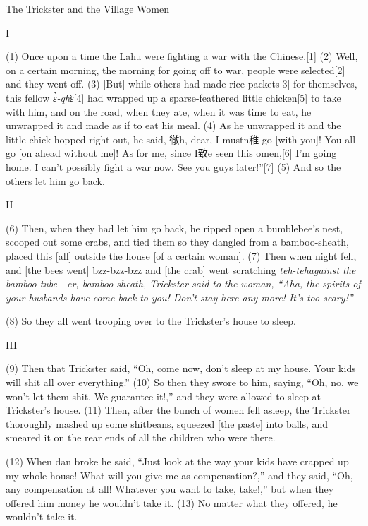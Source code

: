 
The Trickster and the Village Women

I

(1) Once upon a time the Lahu were fighting a war with the Chinese.[1] (2) Well,
on a certain morning, the morning for going off to war, people were selected[2]
and they went off. (3) [But] while others had made rice-packets[3] for themselves,
this fellow \textit{ɛ̀-qhɛ}̀[4] had wrapped up a sparse-feathered little chicken[5]
to take with him, and on the road, when they ate, when it was time to eat, he unwrapped
it and made as if to eat his meal. (4) As he unwrapped it and the little chick
hopped right out, he said, 徹h, dear, I mustn稚 go [with you]! You all go [on
ahead without me]! As for me, since I致e seen this omen,[6] I'm going home. I
can't possibly fight a war now. See you guys later!''[7] (5) And so the others
let him go back.

\begin{center}
II
\end{center}

\leftskip=0pt
(6) Then, when they had let him go back, he ripped open a bumblebee's nest, scooped
out some crabs, and tied them so they dangled from a bamboo-sheath, placed this
[all] outside the house [of a certain woman]. (7) Then when night fell, and [the
bees went] bzz-bzz-bzz and [the crab] went scratching \textit{teh-tehagainst the
bamboo-tube―er, bamboo-sheath, Trickster said to the woman, ``Aha, the spirits
of your husbands have come back to you! Don't stay here any more! It's too scary!''}

(8) So they all went trooping over to the Trickster's house to sleep.

\begin{center}
III
\end{center}

\leftskip=0pt
(9) Then that Trickster said, ``Oh, come now, don't sleep at my house. Your kids
will shit all over everything.'' (10) So then they swore to him, saying, ``Oh,
no, we won't let them shit. We guarantee it!,'' and they were allowed to sleep
at Trickster's house. (11) Then, after the bunch of women fell asleep, the Trickster
thoroughly mashed up some shitbeans, squeezed [the paste] into balls, and smeared
it on the rear ends of all the children who were there.

(12) When dan broke he said, ``Just look at the way your kids have crapped up my
whole house! What will you give me as compensation?,'' and they said, ``Oh, any
compensation at all! Whatever you want to take, take!,'' but when they offered
him money he wouldn't take it. (13) No matter what they offered, he wouldn't take
it.

